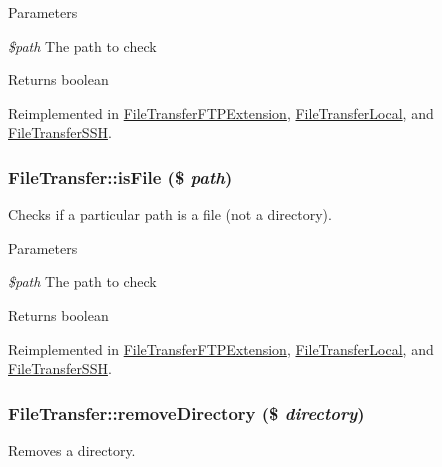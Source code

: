 \begin{DoxyParams}{Parameters}
\item[{\em \$path}]The path to check\end{DoxyParams}
\begin{DoxyReturn}{Returns}
boolean 
\end{DoxyReturn}


Reimplemented in \hyperlink{classFileTransferFTPExtension_a6d067cfbdb848b76fa576c755572777f}{FileTransferFTPExtension}, \hyperlink{classFileTransferLocal_ae17e18a84f3edd9337b3c1ca9dcbd3cf}{FileTransferLocal}, and \hyperlink{classFileTransferSSH_aa7bbccd688eb0dcd05684d4f1cceeee1}{FileTransferSSH}.\hypertarget{classFileTransfer_a0522f0f47d022f2cf8fe375b983d4e39}{
\subsubsection[{isFile}]{\setlength{\rightskip}{0pt plus 5cm}FileTransfer::isFile (\$ {\em path})}}
\label{classFileTransfer_a0522f0f47d022f2cf8fe375b983d4e39}
Checks if a particular path is a file (not a directory).


\begin{DoxyParams}{Parameters}
\item[{\em \$path}]The path to check\end{DoxyParams}
\begin{DoxyReturn}{Returns}
boolean 
\end{DoxyReturn}


Reimplemented in \hyperlink{classFileTransferFTPExtension_ab480d4c5aa1a5a95419155d6367dee43}{FileTransferFTPExtension}, \hyperlink{classFileTransferLocal_a6421f45b2570ef9591aae36b1f3ea72e}{FileTransferLocal}, and \hyperlink{classFileTransferSSH_afa2f90d55ba7e385ec44698d44e48c8a}{FileTransferSSH}.\hypertarget{classFileTransfer_ace033d9eb68691f41d040cc527b0ea5e}{
\subsubsection[{removeDirectory}]{\setlength{\rightskip}{0pt plus 5cm}FileTransfer::removeDirectory (\$ {\em directory})}}
\label{classFileTransfer_ace033d9eb68691f41d040cc527b0ea5e}
Removes a directory.



